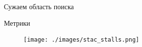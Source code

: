 \documentclass[10pt,aspectratio=169,hyperref={pdftex,unicode},xcolor=dvipsnames]{beamer}
\begin{document}
\begin{frame}[fragile]{ Сужаем область поиска }
\begin{figure}
\begin{subfigure}{0.45\textwidth}
        \end{subfigure}
        \begin{subfigure}{0.45\textwidth}
            \centering
        \end{subfigure}
    \end{figure}

\end{frame}

\begin{frame}{ Метрики }
    \begin{figure}
        \centering
        \texttt{[image: ./images/stac\_stalls.png]}
    \end{figure}
\end{frame}
\end{document}
